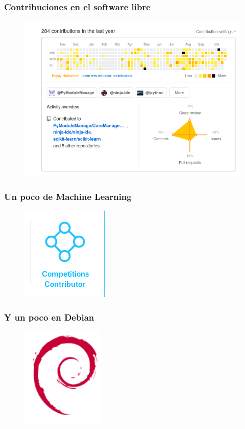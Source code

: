 \documentclass[spanish]{beamer}
\begin{document}
\begin{frame}
	\frametitle{Contribuciones en el software libre}
	\begin{figure}
		\centering
		\includegraphics[width=0.7\linewidth]{contributions}
		\label{fig:contributions}
	\end{figure}
\end{frame}

\begin{frame}
	\frametitle{Un poco de Machine Learning}
	\begin{figure}
		\centering
		\includegraphics[width=0.3\linewidth]{kaggle}
	\end{figure}
\end{frame}

\begin{frame}
	\frametitle{Y un poco en Debian}
	\begin{figure}
		\centering
		\includegraphics[width=0.4\linewidth]{Debian}
	\end{figure}
\end{frame}
\end{document}
